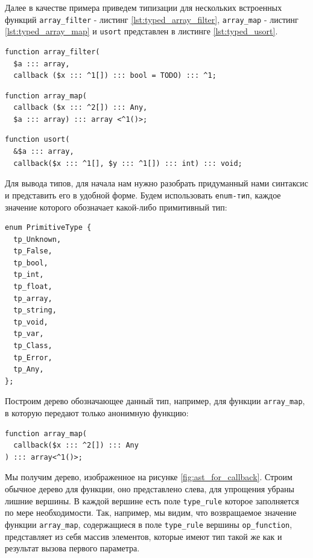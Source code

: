 Далее в качестве примера приведем типизации для нескольких встроенных функций \verb|array_filter| - листинг \ref{lst:typed_array_filter}, \verb|array_map| - листинг \ref{lst:typed_array_map} и \verb|usort| представлен в листинге \ref{lst:typed_usort}.
\begin{lstlisting}[caption={Пример типизации функции array\_filter},label={lst:typed_array_filter}]
function array_filter(
  $a ::: array,
  callback ($x ::: ^1[]) ::: bool = TODO) ::: ^1;
\end{lstlisting}
\begin{lstlisting}[caption={Пример типизации функции array\_map},label={lst:typed_array_map}]
function array_map(
  callback ($x ::: ^2[]) ::: Any,
  $a ::: array) ::: array <^1()>;
\end{lstlisting}
\begin{lstlisting}[caption={Пример типизации функции usort},label={lst:typed_usort}]
function usort(
  &$a ::: array,
  callback($x ::: ^1[], $y ::: ^1[]) ::: int) ::: void;
\end{lstlisting}

Для вывода типов, для начала нам нужно разобрать придуманный нами синтаксис и представить его в удобной форме.
Будем использовать \verb|enum-тип|, каждое значение которого обозначает какой-либо примитивный тип:
\begin{lstlisting}
enum PrimitiveType {
  tp_Unknown,
  tp_False,
  tp_bool,
  tp_int,
  tp_float,
  tp_array,
  tp_string,
  tp_void,
  tp_var,
  tp_Class,
  tp_Error,
  tp_Any,
};
\end{lstlisting}

Построим дерево обозначающее данный тип, например, для функции \verb|array_map|, в которую передают только анонимную функцию:
\begin{lstlisting}[label={lst:array_map_typed_ast}]
function array_map(
  callback($x ::: ^2[]) ::: Any
) ::: array<^1()>;
\end{lstlisting}
Мы получим дерево, изображенное на рисунке \ref{fig:ast_for_callback}.
Строим обычное дерево для функции, оно представлено слева, для упрощения убраны лишние вершины.
В каждой вершине есть поле \verb|type_rule| которое заполняется по мере необходимости.
Так, например, мы видим, что возвращаемое значение функции \verb|array_map|, содержащиеся в поле \verb|type_rule| вершины \verb|op_function|, представляет из себя массив элементов, которые имеют тип такой же как и результат вызова первого параметра.

